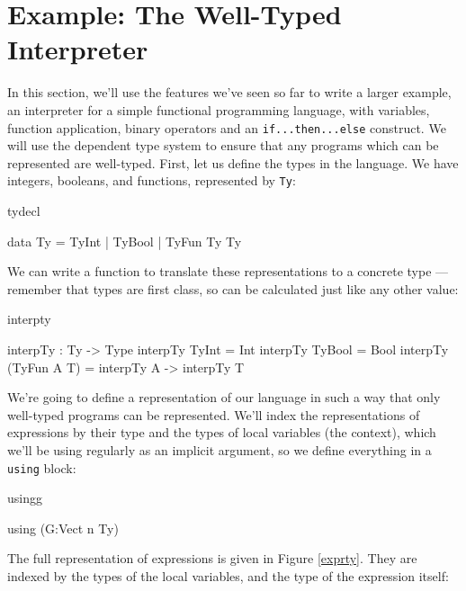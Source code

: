 \section{Example: The Well-Typed Interpreter}

\label{sect:interp}

In this section, we'll use the features we've seen so far to write a larger
example, an interpreter for a simple functional programming language, with
variables, function application, binary operators and an \texttt{if...then...else}
construct. We will use the dependent type system to ensure that any programs
which can be represented are well-typed. First, let us define the types in the
language. We have integers, booleans, and functions, represented by \texttt{Ty}:

\begin{SaveVerbatim}{tydecl}

data Ty = TyInt | TyBool | TyFun Ty Ty

\end{SaveVerbatim}

\noindent
We can write a function to translate these representations to a concrete \Idris{}
type --- remember that types are first class, so can be calculated just like
any other value:

\begin{SaveVerbatim}{interpty}

interpTy : Ty -> Type
interpTy TyInt       = Int
interpTy TyBool      = Bool
interpTy (TyFun A T) = interpTy A -> interpTy T

\end{SaveVerbatim}

\noindent
We're going to define a representation of our language in such a way that only
well-typed programs can be represented. We'll index the representations of
expressions by their type and the types of local variables (the context), which
we'll be using regularly as an implicit argument, so we define everything
in a \texttt{using} block:

\begin{SaveVerbatim}{usingg}

using (G:Vect n Ty)

\end{SaveVerbatim}

\noindent
The full representation of expressions is given in Figure \ref{exprty}. They are
indexed by the types of the local variables, and the type of the expression itself:

